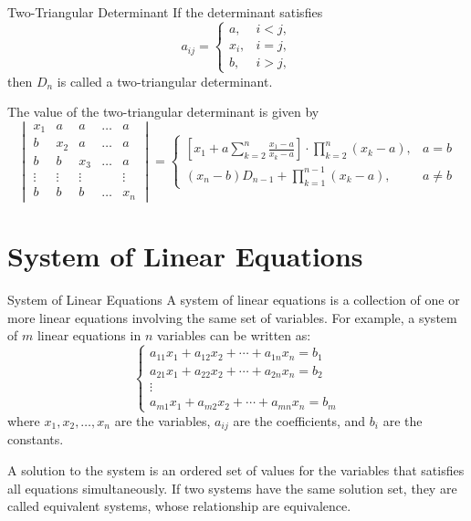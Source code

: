 \documentclass[11pt]{../../TexTemplate/elegantbook} %
\begin{document}
\begin{definition}{Two-Triangular Determinant}
    If the determinant satisfies 
    \[ 
    a_{ij} = \begin{cases} 
    a, & i < j, \\ 
    x_{i}, & i = j, \\ 
    b, & i > j,
    \end{cases} 
    \]
    then \( D_{n} \) is called a two-triangular determinant.
\end{definition}

The value of the two-triangular determinant is given by
\[
\begin{vmatrix}
x_{1} & a & a & \dots & a \\
b & x_{2} & a & \dots & a \\
b & b & x_{3} & \dots & a \\
\vdots & \vdots & \vdots & & \vdots \\
b & b & b & \dots & x_{n}
\end{vmatrix}
=
\begin{cases}
\left[ x_{1} + a \sum\limits^{n}_{k=2} \frac{x_{1}-a}{x_{k}-a} \right] \cdot \prod\limits^{n}_{k=2} (x_{k}-a), & a = b \\
(x_{n}-b) D_{n-1} + \prod\limits^{n-1}_{k=1} (x_{k}-a), & a \neq b 
\end{cases}
\]


\chapter{System of Linear Equations}
\begin{definition}{System of Linear Equations}
    A system of linear equations is a collection of one or more linear equations involving the same set of variables. 
    For example, a system of \( m \) linear equations in \( n \) variables can be written as:
    \[
    \begin{cases}
    a_{11}x_1 + a_{12}x_2 + \cdots + a_{1n}x_n = b_1 \\
    a_{21}x_1 + a_{22}x_2 + \cdots + a_{2n}x_n = b_2 \\
    \vdots \\
    a_{m1}x_1 + a_{m2}x_2 + \cdots + a_{mn}x_n = b_m
    \end{cases}
    \]
    where \( x_1, x_2, \ldots, x_n \) are the variables, \( a_{ij} \) are the coefficients, and \( b_i \) are the constants.

    A solution to the system is an ordered set of values for the variables that satisfies all equations simultaneously.
    If two systems have the same solution set, they are called equivalent systems, 
    whose relationship are equivalence.
\end{definition}
\end{document}
